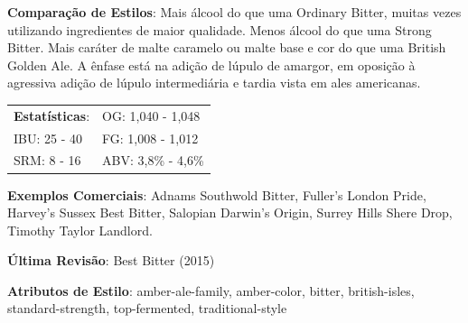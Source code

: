 \textbf{Comparação de Estilos}: Mais álcool do que uma Ordinary Bitter, muitas vezes utilizando ingredientes de maior qualidade. Menos álcool do que uma Strong Bitter. Mais caráter de malte caramelo ou malte base e cor do que uma British Golden Ale. A ênfase está na adição de lúpulo de amargor, em oposição à agressiva adição de lúpulo intermediária e tardia vista em ales americanas.

\begin{tabular}{@{}p{35mm}p{35mm}@{}}
  \textbf{Estatísticas}: & OG: 1,040 - 1,048 \\
  IBU: 25 - 40  & FG: 1,008 - 1,012  \\
  SRM: 8 - 16  & ABV: 3,8\% - 4,6\%
\end{tabular}

\textbf{Exemplos Comerciais}: Adnams Southwold Bitter, Fuller's London Pride, Harvey's Sussex Best Bitter, Salopian Darwin’s Origin, Surrey Hills Shere Drop, Timothy Taylor Landlord.

\textbf{Última Revisão}: Best Bitter (2015)

\textbf{Atributos de Estilo}: amber-ale-family, amber-color, bitter, british-isles, standard-strength, top-fermented, traditional-style

